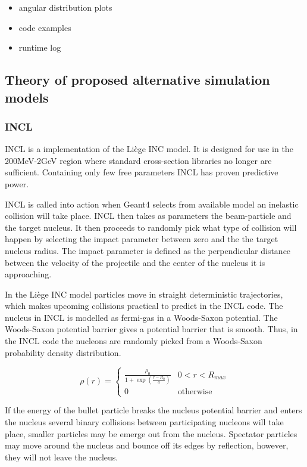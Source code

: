 \clearpage
\begin{itemize}
\item angular distribution plots
\item code examples
\item runtime log
\end{itemize}
\clearpage
\subsection{Theory of proposed alternative simulation models}
\subsubsection{INCL}

INCL is a implementation of the Liège INC model. It is designed for use in the 200MeV-2GeV region where standard cross-section libraries no longer are sufficient. Containing only few free parameters INCL has proven predictive power.

INCL is called into action when Geant4 selects from available model an inelastic collision will take place. INCL then takes as parameters the beam-particle and the target nucleus. It then proceeds to randomly pick what type of collision will happen by selecting the impact parameter between zero and the the target nucleus radius. The impact parameter is defined as the perpendicular distance between the velocity of the projectile and the center of the nucleus it is approaching.

In the Liège INC model particles move in straight deterministic trajectories, which makes upcoming collisions practical to predict in the INCL code.
 The nucleus in INCL is modelled as fermi-gas in a Woods-Saxon potential. %
 The Woods-Saxon potential barrier gives a potential barrier that is smooth. Thus, in the INCL code the nucleons are randomly picked from a Woods-Saxon probability density distribution.

\begin{equation}
\rho(r) = \begin{cases}
\frac{\rho_{0}}{1+\exp({\frac{r-R_{0}}{a}})} & 0 < r < R_{max} \\
0 & \text{otherwise}
\end{cases}
\label{WoodsSaxon2}
\end{equation}

If the energy of the bullet particle breaks the nucleus potential barrier and enters the nucleus several binary collisions between participating nucleons will take place, smaller particles may be emerge out from the nucleus. Spectator particles may move around the nucleus and bounce off its edges by reflection, however, they will not leave the nucleus.

